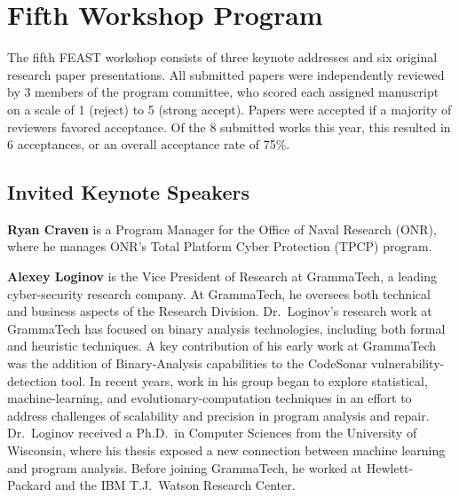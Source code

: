 \documentclass[sigconf]{acmart}
\newcommand\bio[1]{\noindent\textbf{#1}}
\begin{document}
\section{Fifth Workshop Program}
The fifth FEAST workshop consists of three keynote addresses and six original research paper presentations.
All submitted papers were independently reviewed by 3 members of the program committee, who scored each assigned manuscript on a scale of 1 (reject) to 5 (strong accept).
Papers were accepted if a majority of reviewers favored acceptance.
Of the 8 submitted works this year, this resulted in 6 acceptances, or an overall acceptance rate of 75\%.

\subsection{Invited Keynote Speakers}

\bio{Ryan Craven}
is a Program Manager for the Office of Naval Research (ONR),
where he manages ONR's Total Platform Cyber Protection (TPCP) program.

\bigskip

\bio{Alexey Loginov}
is the Vice President of Research at GrammaTech, a leading cyber-security research company.
At GrammaTech, he oversees both technical and business aspects of the Research Division.
Dr.~Loginov's research work at GrammaTech has focused on binary analysis technologies, including both formal and heuristic techniques.
A key contribution of his early work at GrammaTech was the addition of Binary-Analysis capabilities to the CodeSonar vulnerability-detection tool.
In recent years, work in his group began to explore statistical, machine-learning, and evolutionary-computation techniques in an effort to address challenges of scalability and precision in program analysis and repair.
Dr.~Loginov received a Ph.D.~in Computer Sciences from the University of Wisconsin, where his thesis exposed a new connection between machine learning and program analysis.
Before joining GrammaTech, he worked at Hewlett-Packard and the IBM T.J.~Watson Research Center.

\bigskip
\end{document}
